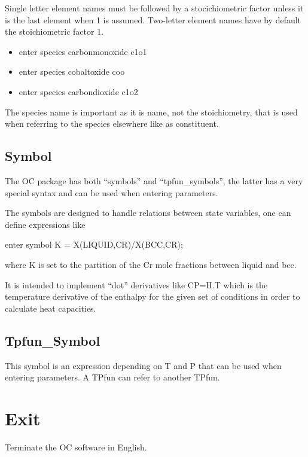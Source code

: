 \documentclass[12pt]{article}
\begin{document}
Single letter element names must be followed by a stocichiometric
factor unless it is the last element when 1 is assumed.  Two-letter
element names have by default the stoichiometric factor 1.

\begin{itemize}
\item enter species carbonmonoxide c1o1
\item enter species cobaltoxide coo
\item enter species carbondioxide c1o2
\end{itemize}

The species name is important as it is name, not the stoichiometry,
that is used when referring to the species elsewhere like as
constituent.

\subsection{Symbol}

The OC package has both ``symbols'' and ``tpfun\_symbols'', the latter
has a very special syntax and can be used when entering parameters.

The symbols are designed to handle relations between state variables,
one can define expressions like 

enter symbol K = X(LIQUID,CR)/X(BCC,CR);

where K is set to the partition of the Cr mole fractions between
liquid and bcc.

It is intended to implement ``dot'' derivatives like CP=H.T which is
the temperature derivative of the enthalpy for the given set of
conditions in order to calculate heat capacities.

\subsection{Tpfun\_Symbol}

This symbol is an expression depending on T and P that can be used
when entering parameters.  A TPfun can refer to another TPfun.

\section{Exit}

Terminate the OC software in English.
\end{document}
